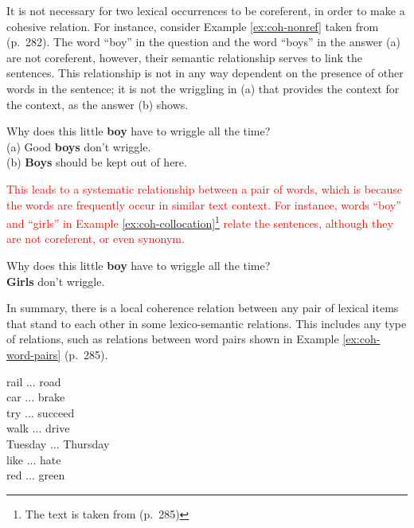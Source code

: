 It is not necessary for two lexical occurrences to be coreferent, in order to make a cohesive relation.  
For instance, consider Example \ref{ex:coh-nonref} taken from (p.~282). 
The word ``boy'' in the question and the word ``boys'' in the answer (a) are not coreferent, however, their semantic relationship serves to link the sentences. 
This relationship is not in any way dependent on the presence of other words in the sentence; it is not the wriggling in (a) that provides the context for the context, as the answer (b) shows. 

\begin{examples}
	\label{ex:coh-nonref}
	Why does this little \textbf{boy} have to wriggle all the time? \\
	(a) Good \textbf{boys} don't wriggle. \\
	(b) \textbf{Boys} should be kept out of here. \\
\end{examples} 

\textcolor{red}{
This leads to a systematic relationship between a pair of words, which is because the words are frequently occur in similar text context. 
For instance, words ``boy'' and ``girls'' in Example \ref{ex:coh-collocation}\footnote{The text is taken from \cite{halliday76}(p.~285)} relate the sentences, although they are not coreferent, or even synonym. 
}
\begin{examples}
	\label{ex:coh-collocation}
	Why does this little \textbf{boy} have to wriggle all the time? \\
	\textbf{Girls} don't wriggle. 
\end{examples}

In summary, there is a local coherence relation between any pair of lexical items that stand to each other in some lexico-semantic relations. 
This includes any type of relations, such as relations between word pairs shown in Example \ref{ex:coh-word-pairs} \cite{halliday76} (p.~285). 

\begin{examples}
	\label{ex:coh-word-pairs}
	rail ... road \\
	car ... brake \\
	try ... succeed \\
	walk ... drive \\
	Tuesday ... Thursday \\
	like ... hate \\
	red ... green 
\end{examples}

